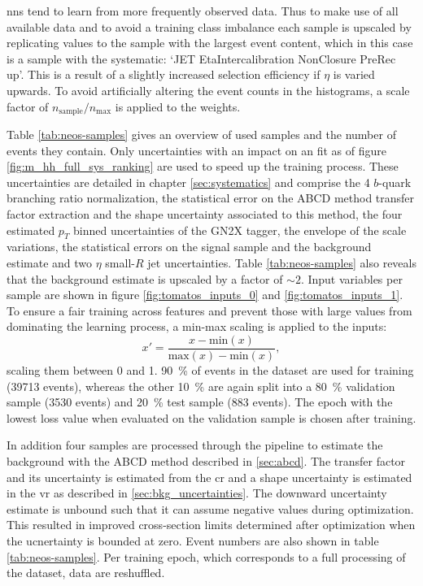 \acp{nn} tend to learn from more frequently observed data. Thus to make use of all available data and to avoid a training class imbalance each sample is upscaled by replicating values to the sample with the largest event content, which in this case is a sample with the systematic: `JET EtaIntercalibration NonClosure PreRec up'. This is a result of a slightly increased selection efficiency if $\eta$ is varied upwards. To avoid artificially altering the event counts in the histograms, a scale factor of $n_\text{sample}/n_\text{max}$ is applied to the weights.

Table \ref{tab:neos-samples} gives an overview of used samples and the number of events they contain. Only uncertainties with an impact on an \mhh{} fit as of figure \ref{fig:m_hh_full_sys_ranking} are used to speed up the training process. These uncertainties are detailed in chapter \ref{sec:systematics} and comprise the 4 $b$-quark branching ratio normalization, the statistical error on the ABCD method transfer factor extraction and the shape uncertainty associated to this method, the four estimated $p_T$ binned uncertainties of the GN2X tagger, the envelope of the scale variations, the statistical errors on the \ktwov signal sample and the background estimate and two $\eta$ small-$R$ jet uncertainties. Table \ref{tab:neos-samples} also reveals that the background estimate is upscaled by a factor of $\sim 2$. Input variables per sample are shown in figure \ref{fig:tomatos_inputs_0} and \ref{fig:tomatos_inputs_1}. To ensure a fair training across features and prevent those with large values from dominating the learning process, a min-max scaling is applied to the inputs:
\begin{equation}
    x'=\frac{x - \text{min}(x)}{\text{max}(x)-\text{min}(x)},
\end{equation}
scaling them between 0 and 1. \qty[]{90}{\percent} of events in the dataset are used for training (39713 events), whereas the other \qty[]{10}{\percent} are again split into a \qty[]{80}{\percent} validation sample (3530 events) and \qty[]{20}{\percent} test sample (883 events). The epoch with the lowest loss value when evaluated on the validation sample is chosen after training.

In addition four samples are processed through the pipeline to estimate the background with the ABCD method described in \ref{sec:abcd}. The transfer factor and its uncertainty is estimated from the \ac{cr} and a shape uncertainty is estimated in the \ac{vr} as described in \ref{sec:bkg_uncertainties}. The downward uncertainty estimate is unbound such that it can assume negative values during optimization. This resulted in improved cross-section limits determined after optimization when the ucnertainty is bounded at zero.  Event numbers are also shown in table \ref{tab:neos-samples}. Per training epoch, which corresponds to a full processing of the dataset, data are reshuffled.

